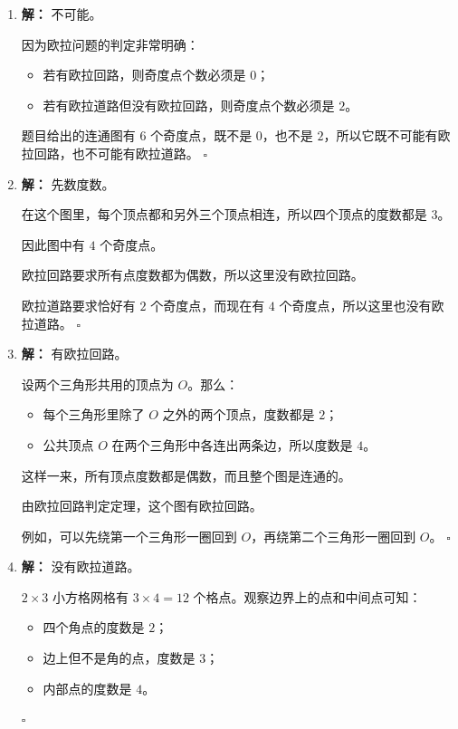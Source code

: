 \documentclass[11pt,a4paper,fontset=fandol]{ctexart}
\theoremstyle{formalexample}
\newenvironment{solution}{\par\noindent\textbf{解：}}{\hfill$\square$\par}
\begin{document}
\begin{enumerate}
  \item \begin{solution}
  不可能。

  因为欧拉问题的判定非常明确：
  \begin{itemize}
    \item 若有欧拉回路，则奇度点个数必须是 $0$；
    \item 若有欧拉道路但没有欧拉回路，则奇度点个数必须是 $2$。
  \end{itemize}

  题目给出的连通图有 $6$ 个奇度点，既不是 $0$，也不是 $2$，所以它既不可能有欧拉回路，也不可能有欧拉道路。
  \end{solution}

  \item \begin{solution}
  先数度数。

  在这个图里，每个顶点都和另外三个顶点相连，所以四个顶点的度数都是 $3$。

  因此图中有 $4$ 个奇度点。

  欧拉回路要求所有点度数都为偶数，所以这里没有欧拉回路。

  欧拉道路要求恰好有 $2$ 个奇度点，而现在有 $4$ 个奇度点，所以这里也没有欧拉道路。
  \end{solution}

  \item \begin{solution}
  有欧拉回路。

  设两个三角形共用的顶点为 $O$。那么：
  \begin{itemize}
    \item 每个三角形里除了 $O$ 之外的两个顶点，度数都是 $2$；
    \item 公共顶点 $O$ 在两个三角形中各连出两条边，所以度数是 $4$。
  \end{itemize}

  这样一来，所有顶点度数都是偶数，而且整个图是连通的。

  由欧拉回路判定定理，这个图有欧拉回路。

  例如，可以先绕第一个三角形一圈回到 $O$，再绕第二个三角形一圈回到 $O$。
  \end{solution}

  \item \begin{solution}
  没有欧拉道路。

  $2\times 3$ 小方格网格有 $3\times 4=12$ 个格点。观察边界上的点和中间点可知：
  \begin{itemize}
    \item 四个角点的度数是 $2$；
    \item 边上但不是角的点，度数是 $3$；
    \item 内部点的度数是 $4$。
  \end{itemize}


\end{solution}
\end{enumerate}
\end{document}
